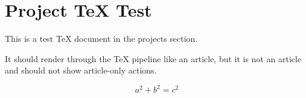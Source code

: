 \section{Project TeX Test}

This is a test TeX document in the projects section.

It should render through the TeX pipeline like an article, but it is not an article and should not show article-only actions.

\[
  a^2 + b^2 = c^2
\]
